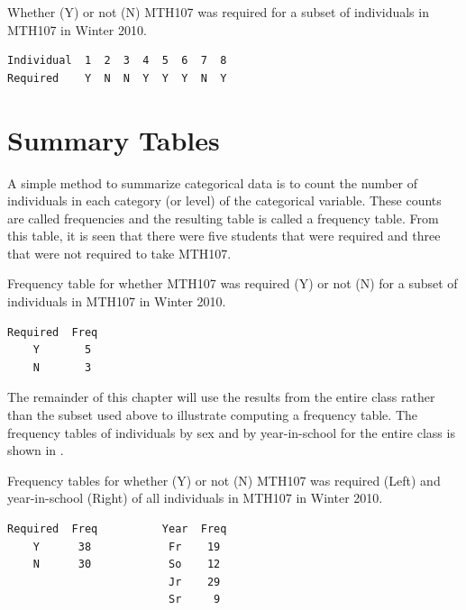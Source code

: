 \documentclass[10pt,openany]{book}\usepackage[]{graphicx}\usepackage[]{color}
\begin{document}
\begin{table}[htbp]
  \caption{Whether (Y) or not (N) MTH107 was required for a subset of individuals in MTH107 in Winter 2010.}
  \label{tab:MTH107Subset}
  \centering
  \begin{Verbatim}[xleftmargin=5mm]
Individual  1  2  3  4  5  6  7  8
Required    Y  N  N  Y  Y  Y  N  Y
  \end{Verbatim}
\end{table}


\section{Summary Tables}
A simple method to summarize categorical data is to count the number of individuals in each category (or level) of the categorical variable.  These counts are called frequencies and the resulting table  is called a frequency table.  From this table, it is seen that there were five students that were required and three that were not required to take MTH107.

\begin{table}[htbp]
  \caption{Frequency table for whether MTH107 was required (Y) or not (N) for a subset of individuals in MTH107 in Winter 2010.}
  \label{tab:MTH107SubsetFreq}
  \centering
  \begin{Verbatim}[xleftmargin=5mm]
Required  Freq
    Y       5
    N       3
  \end{Verbatim}
\end{table}


The remainder of this chapter will use the results from the entire class rather than the subset used above to illustrate computing a frequency table.  The frequency tables of individuals by sex and by year-in-school for the entire class is shown in .

\begin{table}[htbp]
  \caption{Frequency tables for whether (Y) or not (N) MTH107 was required (Left) and year-in-school (Right) of all individuals in MTH107 in Winter 2010.}
  \label{tab:Mth107Freq}
  \centering
  \begin{Verbatim}[xleftmargin=5mm]
Required  Freq          Year  Freq
    Y      38            Fr    19
    N      30            So    12
                         Jr    29
                         Sr     9
   \end{Verbatim}
\end{table}
\end{document}
